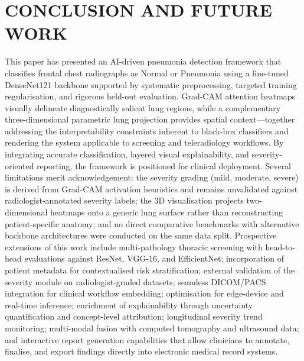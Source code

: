 \documentclass[conference]{IEEEtran}
\begin{document}
\section{\textbf{CONCLUSION AND FUTURE WORK}}
This paper has presented an AI-driven pneumonia detection framework that classifies frontal chest radiographs as Normal or Pneumonia using a fine-tuned DenseNet121 backbone supported by systematic preprocessing, targeted training regularisation, and rigorous held-out evaluation. Grad-CAM attention heatmaps visually delineate diagnostically salient lung regions, while a complementary three-dimensional parametric lung projection provides spatial context—together addressing the interpretability constraints inherent to black-box classifiers and rendering the system applicable to screening and teleradiology workflows. By integrating accurate classification, layered visual explainability, and severity-oriented reporting, the framework is positioned for clinical deployment. Several limitations merit acknowledgement: the severity grading (mild, moderate, severe) is derived from Grad-CAM activation heuristics and remains unvalidated against radiologist-annotated severity labels; the 3D visualisation projects two-dimensional heatmaps onto a generic lung surface rather than reconstructing patient-specific anatomy; and no direct comparative benchmarks with alternative backbone architectures were conducted on the same data split. Prospective extensions of this work include multi-pathology thoracic screening with head-to-head evaluations against ResNet, VGG-16, and EfficientNet; incorporation of patient metadata for contextualised risk stratification; external validation of the severity module on radiologist-graded datasets; seamless DICOM/PACS integration for clinical workflow embedding; optimisation for edge-device and real-time inference; enrichment of explainability through uncertainty quantification and concept-level attribution; longitudinal severity trend monitoring; multi-modal fusion with computed tomography and ultrasound data; and interactive report generation capabilities that allow clinicians to annotate, finalise, and export findings directly into electronic medical record systems.
\end{document}
